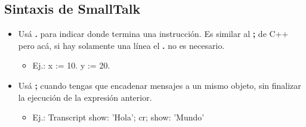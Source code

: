 \documentclass[10pt,a4paper]{article}
\begin{document}
\subsection*{Sintaxis de SmallTalk}
\begin{itemize}
    \item Usá \textbf{.} para indicar donde termina una instrucción. Es similar al \textbf{;} de C++ pero acá, si hay solamente una línea el \textbf{.} no es necesario.
    \begin{itemize}
        \item Ej.: 	x := 10. y := 20.
    \end{itemize}
    \item Usá \textbf{;} cuando tengas que encadenar mensajes a un mismo objeto, sin finalizar la ejecución de la expresión anterior. 
    \begin{itemize}
        \item Ej.: Transcript show: 'Hola'; cr; show: 'Mundo'
    \end{itemize}
\end{itemize}
\end{document}

